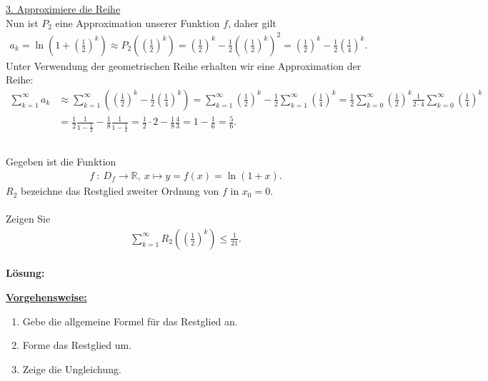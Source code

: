 \underline{3. Approximiere die Reihe}\\
Nun ist $ P_2 $ eine Approximation unserer Funktion $ f $, daher gilt
\begin{align*}
a_k = \ln \left( 1 + \left( \frac{1}{2}\right)^k \right)
\approx P_2 \left( \left( \frac{1}{2}\right)^k\right)
= 
\left(\frac{1}{2}\right)^k - \frac{1}{2} \left(\left(\frac{1}{2}\right)^k \right)^2
=
\left(\frac{1}{2}\right)^k - \frac{1}{2} \left(\frac{1}{4}\right)^k. 
\end{align*} 
Unter Verwendung der geometrischen Reihe erhalten wir eine Approximation der Reihe:
\begin{align*}
\sum \limits_{k=1}^\infty a_k
&\approx 
\sum \limits_{k=1}^\infty
\left(\left(\frac{1}{2}\right)^k - \frac{1}{2} \left(\frac{1}{4}\right)^k\right)
= 
\sum \limits_{k=1}^\infty \left(\frac{1}{2}\right)^k
- \frac{1}{2} \sum \limits_{k=1}^\infty \left(\frac{1}{4}\right)^k
=
\frac{1}{2} \sum \limits_{k=0}^\infty \left(\frac{1}{2}\right)^k
\frac{1}{2\cdot 4} \sum \limits_{k=0}^\infty \left(\frac{1}{4}\right)^k\\
&=\frac{1}{2} \frac{1}{1 - \frac{1}{2}} - \frac{1}{8} \frac{1}{1 - \frac{1}{4}}
= \frac{1}{2} \cdot 2 - \frac{1}{8} \frac{4}{3}
= 1 - \frac{1}{6} = \frac{5}{6}.
\end{align*}      
\newpage          
                  
\subsection*{}
Gegeben ist die Funktion
\begin{align*}
f \ : \ D_f \to \mathbb{R}, \ x \mapsto y = f(x) = \ln(1+x).
\end{align*}
$ R_2 $ bezeichne das Restglied zweiter Ordnung von $ f  $ in $ x_0 = 0 $.\\
\\
Zeigen Sie
\begin{align*}
\sum \limits_{k=1}^\infty R_2 \left( \left( \frac{1}{2}\right)^k \right) \leq \frac{1}{21}.
\end{align*}
\\
\textbf{Lösung:}
\begin{mdframed}
\underline{\textbf{Vorgehensweise:}}
\begin{enumerate}
\renewcommand{\labelenumi}{\theenumi.}
\item Gebe die allgemeine Formel für das Restglied an.
\item Forme das Restglied um.
\item Zeige die Ungleichung.
\end{enumerate}
\end{mdframed}

